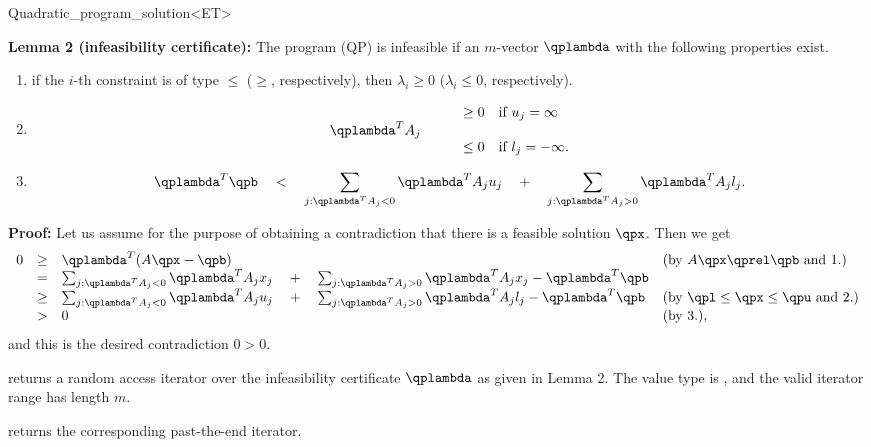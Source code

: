 \begin{ccRefClass}{Quadratic_program_solution<ET>}
\begin{ccAdvanced}
\ccExample
{}

{\bf Lemma 2 (infeasibility certificate):} The program (QP) is
infeasible if an $m$-vector $\qplambda$ with the
following properties exist.
\begin{enumerate}
\item if the $i$-th constraint is of type $\leq$ ($\geq$, respectively), 
then $\lambda_i\geq 0$ ($\lambda_i\leq 0$, respectively).
\item 
\[
\begin{array}{llll}
&&\geq 0 & \mbox{if $u_j=\infty$} \\
\qplambda^T A_j &\quad  \\
&&\leq 0 & \mbox{if $l_j=-\infty$.}
\end{array}
\]
\item \[\qplambda^T\qpb \quad<\quad \sum_{j: \qplambda^TA_j <0} \qplambda^TA_j u_j 
\quad+\quad  \sum_{j: \qplambda^TA_j >0} \qplambda^TA_j l_j.\]
\end{enumerate}

{\bf Proof:} Let us assume for the purpose of obtaining a contradiction
that there is a feasible solution $\qpx$. Then we get
\[
\begin{array}{lcll}
0 &\geq& \qplambda^T(A\qpx -\qpb) &  \mbox{(by $A\qpx\qprel \qpb$ and 1.)} \\
  &=& \sum_{j: \qplambda^TA_j <0} \qplambda^TA_j x_j 
\quad+\quad  \sum_{j: \qplambda^TA_j >0} \qplambda^TA_j x_j - \qplambda^T \qpb \\
  &\geq& \sum_{j: \qplambda^TA_j <0} \qplambda^TA_j u_j 
\quad+\quad  \sum_{j: \qplambda^TA_j >0} \qplambda^TA_j l_j - \qplambda^T \qpb &
\mbox{(by $\qpl\leq \qpx \leq \qpu$ and 2.)} \\
  &>& 0 & \mbox{(by 3.)}, 
\end{array}
\]
and this is the desired contradiction $0>0$.


{returns a random access iterator over the infeasibility certificate 
$\qplambda$ as given in Lemma 2. The value type
is , and the valid iterator range has length $m$.
\ccPrecond \ccVar{}}

{returns the corresponding past-the-end iterator.}

\ccExample
{}


\end{ccAdvanced}
\end{ccRefClass}
